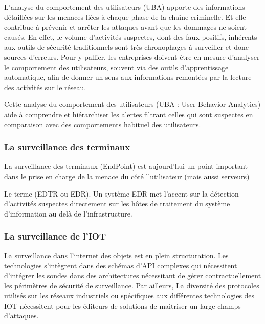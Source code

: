 
L’analyse du comportement des utilisateurs (UBA) apporte des informations détaillées sur les menaces liées à chaque phase de la chaîne criminelle. Et elle contribue à prévenir et arrêter les attaques avant que les dommages ne soient causés. En effet, le volume d’activités suspectes, dont des faux positifs, inhérents aux outils de sécurité traditionnels sont très chronophages à surveiller et donc sources d’erreurs.
Pour y pallier, les entreprises doivent être en mesure d’analyser le comportement des utilisateurs, souvent via des outils d'apprentissage automatique, afin de donner un sens aux informations remontées par la lecture des activités sur le réseau.

Cette analyse du comportement des utilisateurs (UBA : User Behavior Analytics) aide à  comprendre et hiérarchiser les alertes filtrant celles qui sont suspectes en comparaison avec des comportements habituel des utilisateurs.

\subsubsection{La surveillance des terminaux}

La surveillance des terminaux (EndPoint) est aujourd'hui un point important dans le prise en charge de la menace du côté l'utilisateur (mais aussi serveurs)

 Le  terme  (EDTR ou EDR). Un système EDR met  l’accent sur la détection d’activités suspectes directement sur les hôtes de traitement du système d'information au delà de l'infrastructure. 

\subsubsection{La surveillance de l'IOT}


La surveillance dans l'internet des objets est en plein structuration. Les technologies s'intègrent dans des schémas d'API complexes qui nécessitent d'intégrer les sondes dans des architectures nécessitant de gérer contractuellement les périmètres de sécurité de surveillance. Par ailleurs, La diversité des protocoles utilisés sur les réseaux industriels ou spécifiques aux différentes technologies des IOT nécessitent pour les éditeurs de solutions de maitriser un large champs d'attaques.

